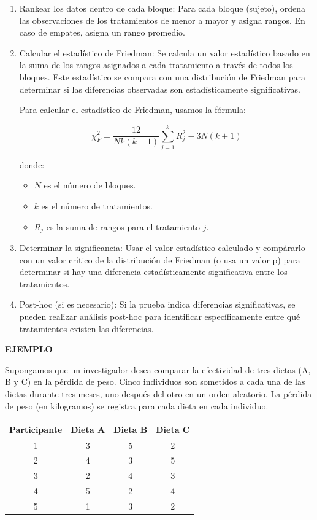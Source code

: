 \documentclass{article}
\begin{document}
\begin{enumerate}
    \item Rankear los datos dentro de cada bloque: Para cada bloque (sujeto), ordena las observaciones de los tratamientos de menor a mayor y asigna rangos. En caso de empates, asigna un rango promedio.
    \item Calcular el estadístico de Friedman: Se calcula un valor estadístico basado en la suma de los rangos asignados a cada tratamiento a través de todos los bloques. Este estadístico se compara con una distribución de Friedman para determinar si las diferencias observadas son estadísticamente significativas.

          Para calcular el estadístico de Friedman, usamos la fórmula:

          \[ \chi_F^2 = \frac{12}{Nk(k+1)} \sum_{j=1}^k R_j^2 - 3N(k+1) \]

          donde:
          \begin{itemize}
              \item $N$ es el número de bloques.
              \item $k$ es el número de tratamientos.
              \item $R_j$ es la suma de rangos para el tratamiento $j$.
          \end{itemize}

    \item Determinar la significancia: Usar el valor estadístico calculado y compárarlo con un valor crítico de la distribución de Friedman (o usa un valor p) para determinar si hay una diferencia estadísticamente significativa entre los tratamientos.
    \item Post-hoc (si es necesario): Si la prueba indica diferencias significativas, se pueden realizar análisis post-hoc para identificar específicamente entre qué tratamientos existen las diferencias.
\end{enumerate}



\textbf{EJEMPLO}

Supongamos que un investigador desea comparar la efectividad de tres dietas (A, B y C) en la pérdida de peso. Cinco individuos son sometidos a cada una de las dietas durante tres meses, uno después del otro en un orden aleatorio. La pérdida de peso (en kilogramos) se registra para cada dieta en cada individuo.

\begin{center}
    \begin{tabular}{ c c c c }
        Participante & Dieta A & Dieta B & Dieta C \\
        \hline
        1            & 3       & 5       & 2       \\
        2            & 4       & 3       & 5       \\
        3            & 2       & 4       & 3       \\
        4            & 5       & 2       & 4       \\
        5            & 1       & 3       & 2       \\
    \end{tabular}
\end{center}
\end{document}
